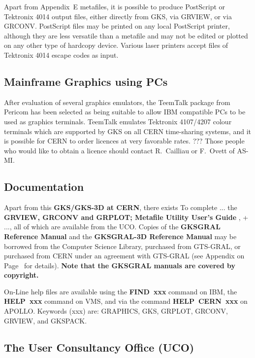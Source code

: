 Apart from Appendix~E metafiles, it is possible to produce PostScript
or Tektronix 4014 output files, either directly from GKS, via GRVIEW,
or via GRCONV.
PostScript files may be printed on any local PostScript printer,
although they are less versatile than a metafile and may not be edited or
plotted on any other type of hardcopy device. Various laser printers
accept files of Tektronix 4014 escape codes as input.
\subsection{Mainframe Graphics using PCs}
 
After evaluation of several graphics emulators, the TeemTalk package
from Pericom has been selected as being suitable to allow IBM compatible
PCs to be used as graphics terminals. TeemTalk emulates Tektronix
4107/4207 colour terminals which are supported by GKS on all CERN
time-sharing systems, and it is possible for CERN to order licences at
very favorable rates.
\Lit{$==>$} ??? Those people who would like to obtain a licence should contact
R.~Cailliau or F.~Ovett of AS-MI.
\subsection{Documentation}
 
Apart from this {\bf GKS/GKS-3D at CERN}, there exists
\Lit{$==>$} To complete ...
the {\bf GRVIEW, GRCONV and GRPLOT; Metafile Utility User's Guide}
\cite{bib-grref}, + ...,
all of which are available from the UCO.
Copies of the {\bf GKSGRAL Reference Manual} \cite{bib-gtsref} and the
{\bf GKSGRAL-3D Reference Manual} \cite{bib-gtsref3} may be borrowed
from the Computer Science Library, purchased from GTS-GRAL,
or purchased from CERN under an agreement with GTS-GRAL
(see Appendix on Page~\pageref{sec:gtsdist} for details).
{\bf Note that the GKSGRAL manuals are covered by copyright.}
 
On-Line help files are available using the {\bf FIND~xxx} command on
IBM, the {\bf HELP~xxx} command on VMS,
and via the command {\bf HELP~CERN~xxx} on APOLLO.
Keywords (xxx) are:
GRAPHICS, GKS, GRPLOT, GRCONV, GRVIEW, and GKSPACK.
\subsection{The User Consultancy Office (UCO)}
 

